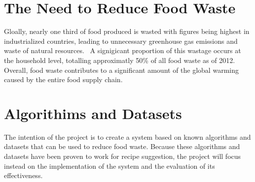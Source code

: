 
\section{The Need to Reduce Food Waste}
Gloally, nearly one third of food produced is wasted with figures being highest
in industrialized countries, leading to unnecessary greenhouse gas emissions and
waste of natural resources.~\cite{gustavsson_global_2011} A signigicant proportion
of this wastage occurs at the household level, totalling approximatly 50\% of all
food waste as of 2012.~\cite{stenmarck_estimates_2016} Overall, food waste contributes
to a significant amount of the global warming caused by the entire food supply
chain.~\cite{scherhaufer_environmental_2018}

\section{Algorithims and Datasets}
The intention of the project is to create a system based on known algorithms and
datasets that can be used to reduce food waste. Because these algorithms and
datasets have been proven to work for recipe suggestion, the project will focus
instead on the implementation of the system and the evaluation of its effectiveness.
